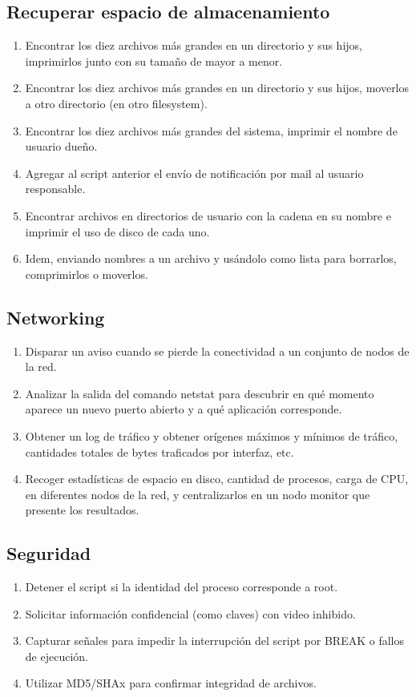 \subsection{Recuperar espacio de almacenamiento}
\begin{enumerate}
	\item Encontrar los diez archivos más grandes en un directorio y sus hijos, imprimirlos junto con su tamaño de mayor a menor.
	\item Encontrar los diez archivos más grandes en un directorio y sus hijos, moverlos a otro directorio (en otro filesystem).
	\item Encontrar los diez archivos más grandes del sistema, imprimir el nombre de usuario dueño.
	\item Agregar al script anterior el envío de notificación por mail al usuario responsable.
		\item 
Encontrar archivos en directorios de usuario con la cadena  en su nombre e imprimir el uso de disco de cada uno.
	\item 
Idem, enviando nombres a un archivo y usándolo como lista para borrarlos, comprimirlos o moverlos.

\end{enumerate}

\subsection{Networking}
\begin{enumerate}
	\item 
Disparar un aviso cuando se pierde la conectividad a un conjunto de nodos de la red.
	\item 
Analizar la salida del comando netstat para descubrir en qué momento aparece un nuevo puerto abierto y a qué aplicación corresponde.
	\item 
Obtener un log de tráfico y obtener orígenes máximos y mínimos de tráfico, cantidades totales de bytes traficados por interfaz, etc.
	\item 
Recoger estadísticas de espacio en disco, cantidad de procesos, carga de CPU, en diferentes nodos de la red, y centralizarlos en un nodo monitor que presente los resultados.
\end{enumerate}

\subsection{Seguridad}
\begin{enumerate}
	\item 
Detener el script si la identidad del proceso corresponde a root.
	\item 
Solicitar información confidencial (como claves) con video inhibido.
	\item 
Capturar señales para impedir la interrupción del script por BREAK o fallos de ejecución.
	\item 
Utilizar MD5/SHAx para confirmar integridad de archivos.
\end{enumerate}




